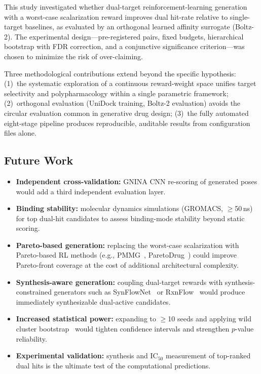 
This study investigated whether dual-target reinforcement-learning
generation with a worst-case scalarization reward improves dual hit-rate
relative to single-target baselines, as evaluated by an orthogonal learned
affinity surrogate (Boltz-2).  The experimental design---pre-registered
pairs, fixed budgets, hierarchical bootstrap with FDR correction, and
a conjunctive significance criterion---was chosen to minimize the risk
of over-claiming.


Three methodological contributions extend beyond the specific hypothesis:
(1)~the systematic exploration of a continuous reward-weight space unifies
target selectivity and polypharmacology within a single parametric framework;
(2)~orthogonal evaluation (UniDock training, Boltz-2 evaluation) avoids the
circular evaluation common in generative drug design;
(3)~the fully automated eight-stage pipeline produces reproducible,
auditable results from configuration files alone.

\subsection*{Future Work}

\begin{itemize}
\item \textbf{Independent cross-validation:} GNINA CNN re-scoring of
  generated poses would add a third independent evaluation layer.
\item \textbf{Binding stability:} molecular dynamics simulations
  (GROMACS, $\geq$50\,ns) for top dual-hit candidates to assess
  binding-mode stability beyond static scoring.
\item \textbf{Pareto-based generation:} replacing the worst-case
  scalarization with Pareto-based RL methods
  (e.g., PMMG~\citep{pmmg2025}, ParetoDrug~\citep{paretodrug2024})
  could improve Pareto-front coverage at the cost of additional
  architectural complexity.
\item \textbf{Synthesis-aware generation:} coupling dual-target
  rewards with synthesis-constrained generators such as
  SynFlowNet~\citep{cretu2025synflownet} or
  RxnFlow~\citep{lee2025rxnflow} would produce immediately
  synthesizable dual-active candidates.
\item \textbf{Increased statistical power:} expanding to
  $\geq$10 seeds and applying wild cluster
  bootstrap~\citep{cameron2008bootstrap} would tighten confidence
  intervals and strengthen $p$-value reliability.
\item \textbf{Experimental validation:} synthesis and IC$_{50}$
  measurement of top-ranked dual hits is the ultimate test of
  the computational predictions.
\end{itemize}
